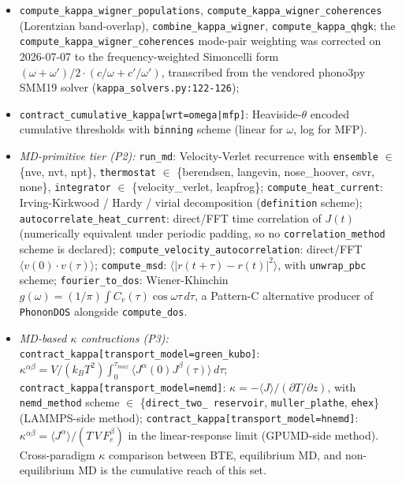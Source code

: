 \documentclass[11pt,a4paper]{article}
\begin{document}
\begin{itemize}[leftmargin=2em, itemsep=0.2em]
        \texttt{sum\_linewidths} (Matthiessen): the sibling channels
        joining \texttt{compute\_anharmonic\_linewidth} above;
  \item \texttt{compute\_kappa\_wigner\_populations},
        \texttt{compute\_kappa\_wigner\_coherences} (Lorentzian
        band-overlap), \texttt{combine\_kappa\_wigner},
        \texttt{compute\_kappa\_qhgk}; the \texttt{compute\_kappa\_wigner\_coherences}
        mode-pair weighting was corrected on 2026-07-07 to the frequency-weighted
        Simoncelli form $(\omega+\omega')/2\cdot(c/\omega + c'/\omega')$,
        transcribed from the vendored phono3py SMM19 solver
        (\texttt{kappa\_solvers.py:122-126});
  \item \texttt{contract\_cumulative\_kappa[wrt=omega|mfp]}:
        Heaviside-$\theta$ encoded cumulative thresholds with
        \texttt{binning} scheme (linear for $\omega$, log for MFP).
  \item \emph{MD-primitive tier (P2):}
        \texttt{run\_md}: Velocity-Verlet recurrence with
        \texttt{ensemble} $\in$ \{nve, nvt, npt\},
        \texttt{thermostat} $\in$ \{berendsen, langevin, nose\_hoover,
        csvr, none\}, \texttt{integrator} $\in$ \{velocity\_verlet,
        leapfrog\};
        \texttt{compute\_heat\_current}: Irving-Kirkwood / Hardy
        / virial decomposition (\texttt{definition} scheme);
        \texttt{autocorrelate\_heat\_current}: direct/FFT time
        correlation of $J(t)$ (numerically equivalent under periodic
        padding, so no \texttt{correlation\_method} scheme is declared);
        \texttt{compute\_velocity\_autocorrelation}: direct/FFT
        $\langle v(0)\cdot v(\tau)\rangle$;
        \texttt{compute\_msd}: $\langle |r(t+\tau)-r(t)|^2\rangle$,
        with \texttt{unwrap\_pbc} scheme;
        \texttt{fourier\_to\_dos}: Wiener-Khinchin $g(\omega) =
        (1/\pi)\int C_v(\tau)\cos\omega\tau\,d\tau$, a Pattern-C
        alternative producer of \texttt{PhononDOS} alongside
        \texttt{compute\_dos}.
  \item \emph{MD-based $\kappa$ contractions (P3):}
        \texttt{contract\_kappa[transport\_model=green\_kubo]}:
        $\kappa^{\alpha\beta} = V/(k_B T^2) \int_0^{\tau_{max}}
        \langle J^\alpha(0)J^\beta(\tau)\rangle\,d\tau$;
        \texttt{contract\_kappa[transport\_model=nemd]}:
        $\kappa = -\langle J\rangle / (\partial T/\partial z)$, with
        \texttt{nemd\_method} scheme $\in$ \{\texttt{direct\_two\_
        reservoir}, \texttt{muller\_plathe}, \texttt{ehex}\} (LAMMPS-side
        method);
        \texttt{contract\_kappa[transport\_model=hnemd]}:
        $\kappa^{\alpha\beta} = \langle J^\alpha\rangle / (T\,V\,F_e^\beta)$
        in the linear-response limit (GPUMD-side method). Cross-paradigm
        $\kappa$ comparison between BTE, equilibrium MD, and
        non-equilibrium MD is the cumulative reach of this set.
\end{itemize}
\end{document}

